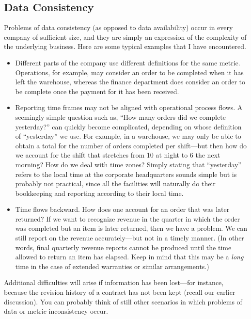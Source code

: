 \vspace*{-6pt}
\subsection{Data Consistency}
 
    
Problems of data consistency (as opposed to data availability) occur
in every company of sufficient size, and they are simply an expression
of the complexity of the underlying business. Here are some typical
examples that I have encountered.

\begin{itemize}
\item Different parts of the company use different definitions for the
  same metric. Operations, for example, may consider an order to be
  completed when it has left the warehouse, whereas the finance
  department does consider an order to be complete once the payment
  for it has been received.
\item Reporting time frames may not be aligned with operational
  process flows. A seemingly simple question such as, ``How many orders
  did we complete yesterday?'' can quickly become complicated,
  depending on whose definition of ``yesterday'' we use.  For example,
  in a warehouse, we may only be able to obtain a total for the number
  of orders completed per shift---but then how do we account for the
  shift that stretches from 10 at night to 6 the next morning? How do\vadjust{\pagebreak}
  we deal with time zones? Simply stating that ``yesterday'' refers to
  the local time at the corporate headquarters sounds simple but is
  probably not practical, since all the facilities will naturally do
  their bookkeeping and reporting according to their local time.
\item Time flows backward. How does one account for an order that was
  later returned? If we want to recognize revenue in the quarter in
  which the order was completed but an item is later returned, then we
  have a problem. We can still report on the revenue accurately---but
  not in a timely manner. (In other words, final quarterly revenue
  reports cannot be produced until the time allowed to return an item
  has elapsed. Keep in mind that this may be a \emph{long} time in the
  case of extended warranties or similar arrangements.)
\end{itemize}
        
Additional difficulties will arise if information has been lost---for
instance, because the revision history of a contract has not been kept
(recall our earlier discussion). You can probably think of still other
scenarios in which problems of data or metric inconsistency occur.
    
